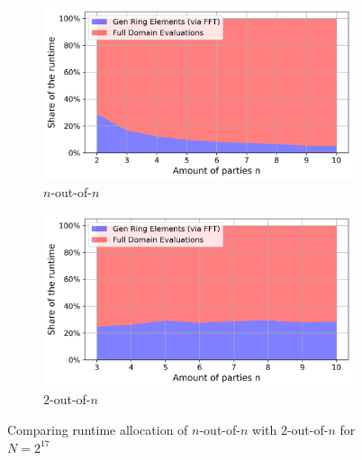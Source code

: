 \begin{figure}[t]
    \hspace{-1em}
    \begin{subfigure}[b]{0.5\textwidth}
        \centering
        \includegraphics[scale=0.49]{images/plots/bbs_noutofN_percentage_dist.png}
        \caption{$n$-out-of-$n$}
    \end{subfigure}
    \hspace{0em}
    \begin{subfigure}[b]{0.5\textwidth}
        \centering
        \includegraphics[scale=0.49]{images/plots/bbs_TAUoutofN_percentage_dist.png}
        \caption{$2$-out-of-$n$}
    \end{subfigure}

    \caption{Comparing runtime allocation of $n$-out-of-$n$ with $2$-out-of-$n$ for $N=2^{17}$}
\label{fig:runtimeAllocationComparision}
\end{figure}

